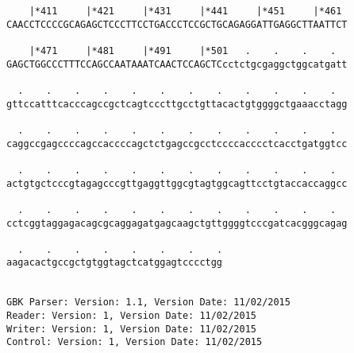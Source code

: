 \documentclass{article}
\begin{document}
\begin{Verbatim}
    |*411     |*421     |*431     |*441     |*451     |*461 
CAACCTCCCCGCAGAGCTCCCTTCCTGACCCTCCGCTGCAGAGGATTGAGGCTTAATTCT
                                                            
    |*471     |*481     |*491     |*501   .    .    .    .  
GAGCTGGCCCTTTCCAGCCAATAAATCAACTCCAGCTCcctctgcgaggctggcatgatt
                                                            
  .    .    .    .    .    .    .    .    .    .    .    .  
gttccatttcacccagccgctcagtcccttgcctgttacactgtggggctgaaacctagg
                                                            
  .    .    .    .    .    .    .    .    .    .    .    .  
caggccgagccccagccaccccagctctgagccgcctccccacccctcacctgatggtcc
                                                            
  .    .    .    .    .    .    .    .    .    .    .    .  
actgtgctcccgtagagcccgttgaggttggcgtagtggcagttcctgtaccaccaggcc
                                                            
  .    .    .    .    .    .    .    .    .    .    .    .  
cctcggtaggagacagcgcaggagatgagcaagctgttggggtcccgatcacgggcagag
                                                            
  .    .    .    .    .    .    .    .
aagacactgccgctgtggtagctcatggagtcccctgg
                                      
                                      
GBK Parser: Version: 1.1, Version Date: 11/02/2015
Reader: Version: 1, Version Date: 11/02/2015
Writer: Version: 1, Version Date: 11/02/2015
Control: Version: 1, Version Date: 11/02/2015
\end{Verbatim}
\end{document}
